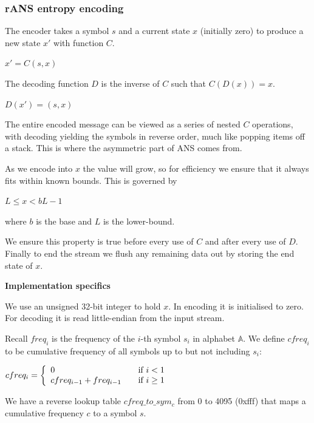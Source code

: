 \documentclass[a4paper]{article}
\begin{document}
\subsubsection{rANS entropy encoding}

The encoder takes a symbol $s$ and a current state $x$ (initially zero) to
produce a new state $x'$ with function $C$.

{
\setlength{\parindent}{1cm}
\indent $x' = C(s,x)$
}

The decoding function $D$ is the inverse of $C$ such that $C(D(x)) = x$.

{
\setlength{\parindent}{1cm}
\indent $D(x') = (s,x)$
}

The entire encoded message can be viewed as a series of nested $C$
operations, with decoding yielding the symbols in reverse order, much
like popping items off a stack.  This is where the asymmetric part of
ANS comes from.

As we encode into $x$ the value will grow, so for efficiency we ensure
that it always fits within known bounds. This is governed by

{
\setlength{\parindent}{1cm}
\indent $L \leq x < bL-1$
}


where $b$ is the base and $L$ is the lower-bound.

We ensure this property is true before every use of $C$ and after every
use of $D$.  Finally to end the stream we flush any remaining data out
by storing the end state of $x$.


\textbf{Implementation specifics}

We use an unsigned 32-bit integer to hold $x$. In encoding it is
initialised to zero. For decoding it is read little-endian from the
input stream.

Recall $freq_{i}$ is the frequency of the $i$-th symbol $s_{i}$ in alphabet
$\mathbb{A}$.  We define $cfreq_i$ to be cumulative frequency of all symbols
up to but not including $s_{i}$:

{
\setlength{\parindent}{1cm}
$ cfreq_{i} = \left\{
\begin{array}{l l}
0 & \quad \textrm{if $i < 1$} \\
cfreq_{i-1} + freq_{i-1} & \quad \textrm{if $i \geq 1$}
\end{array}
\right. $
}


We have a reverse lookup table $cfreq\_to\_sym_c$ from 0 to 4095
(0xfff) that maps a cumulative frequency $c$ to a symbol $s$.
\end{document}
